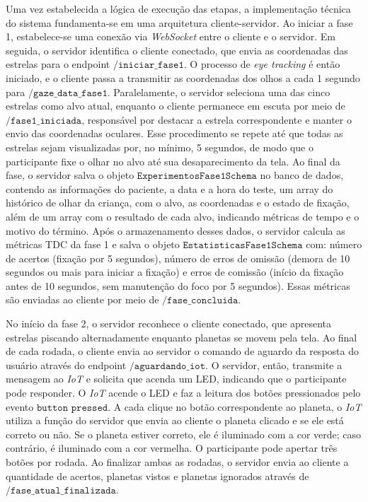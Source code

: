 \documentclass[11pt,a4paper]{article}
\begin{document}
Uma vez estabelecida a lógica de execução das etapas, a implementação técnica do sistema fundamenta-se em uma arquitetura cliente-servidor. Ao iniciar a fase 1, estabelece-se uma conexão via \textit{WebSocket} entre o cliente e o servidor. Em seguida, o servidor identifica o cliente conectado, que envia as coordenadas das estrelas para o endpoint $\texttt{/iniciar\_fase1}$. O processo de \textit{eye tracking} é então iniciado, e o cliente passa a transmitir as coordenadas dos olhos a cada 1 segundo para $\texttt{/gaze\_data\_fase1}$. Paralelamente, o servidor seleciona uma das cinco estrelas como alvo atual, enquanto o cliente permanece em escuta por meio de $\texttt{/fase1\_iniciada}$, responsável por destacar a estrela correspondente e manter o envio das coordenadas oculares. Esse procedimento se repete até que todas as estrelas sejam visualizadas por, no mínimo, 5 segundos, de modo que o participante fixe o olhar no alvo até sua desaparecimento da tela. Ao final da fase, o servidor salva o objeto $\texttt{ExperimentosFase1Schema}$ no banco de dados, contendo as informações do paciente, a data e a hora do teste, um array do histórico de olhar da criança, com o alvo, as coordenadas e o estado de fixação, além de um array com o resultado de cada alvo, indicando métricas de tempo e o motivo do término. Após o armazenamento desses dados, o servidor calcula as métricas TDC da fase 1 e salva o objeto $\texttt{EstatisticasFase1Schema}$ com: número de acertos (fixação por 5 segundos), número de erros de omissão (demora de 10 segundos ou mais para iniciar a fixação) e erros de comissão (início da fixação antes de 10 segundos, sem manutenção do foco por 5 segundos). Essas métricas são enviadas ao cliente por meio de $\texttt{/fase\_concluida}$. 

No início da fase 2, o servidor reconhece o cliente conectado, que apresenta estrelas piscando alternadamente enquanto planetas se movem pela tela. Ao final de cada rodada, o cliente envia ao servidor o comando de aguardo da resposta do usuário através do endpoint $\texttt{/aguardando\_iot}$. O servidor, então, transmite a mensagem ao \textit{IoT} e solicita que acenda um LED, indicando que o participante pode responder. O \textit{IoT} acende o LED e faz a leitura dos botões pressionados pelo evento $\texttt{button pressed}$. A cada clique no botão correspondente ao planeta, o \textit{IoT} utiliza a função do servidor que envia ao cliente o planeta clicado e se ele está correto ou não. Se o planeta estiver correto, ele é iluminado com a cor verde; caso contrário, é iluminado com a cor vermelha. O participante pode apertar três botões por rodada. Ao finalizar ambas as rodadas, o servidor envia ao cliente a quantidade de acertos, planetas vistos e planetas ignorados através de $\texttt{/fase\_atual\_finalizada}$.
\end{document}
